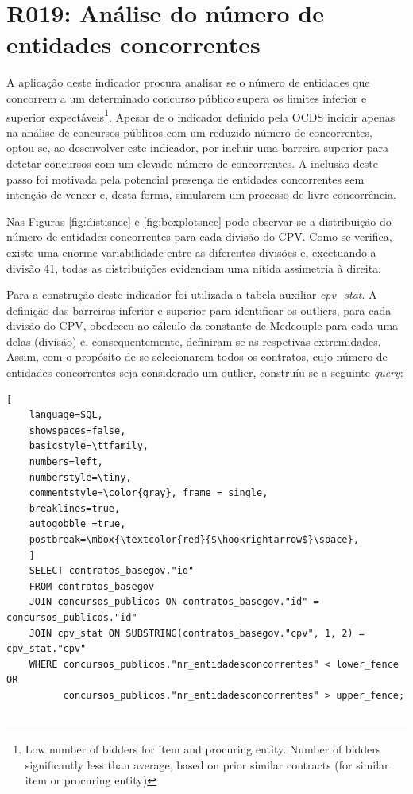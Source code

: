 \section{R019: Análise do número de entidades concorrentes}

A aplicação deste indicador procura analisar se o número de entidades que concorrem a um determinado concurso público supera os limites inferior e superior expectáveis\footnote{Low number of bidders for item and procuring entity. Number of bidders significantly less than average, based on prior similar contracts (for similar item or procuring entity)}. Apesar de o indicador definido pela OCDS incidir apenas na análise de concursos públicos com um reduzido número de concorrentes, optou-se, ao desenvolver este indicador, por incluir uma barreira superior para detetar concursos com um elevado número de concorrentes. A inclusão deste passo foi motivada pela potencial presença de entidades concorrentes sem intenção de vencer e, desta forma, simularem um processo de livre concorrência.


Nas Figuras \ref{fig:distisnec} e \ref{fig:boxplotsnec} pode observar-se a distribuição do número de entidades concorrentes para cada divisão do CPV. Como se verifica, existe uma enorme variabilidade entre as diferentes divisões e, excetuando a divisão 41, todas as distribuições evidenciam uma nítida assimetria à direita.


Para a construção deste indicador foi utilizada a tabela auxiliar \textit{cpv\_stat}. A definição das barreiras inferior e superior para identificar os outliers, para cada divisão do CPV, obedeceu ao cálculo da constante de Medcouple para cada uma delas (divisão) e, consequentemente, definiram-se as respetivas extremidades. Assim, com o propósito de se selecionarem todos os contratos, cujo número de entidades concorrentes seja considerado um outlier, construíu-se a seguinte \textit{query}: 

\begin{lstlisting}[
	language=SQL,
	showspaces=false,
	basicstyle=\ttfamily,
	numbers=left,
	numberstyle=\tiny,
	commentstyle=\color{gray}, frame = single,
	breaklines=true,
	autogobble =true,
	postbreak=\mbox{\textcolor{red}{$\hookrightarrow$}\space},
	]
	SELECT contratos_basegov."id"
	FROM contratos_basegov 
	JOIN concursos_publicos ON contratos_basegov."id" = concursos_publicos."id"
	JOIN cpv_stat ON SUBSTRING(contratos_basegov."cpv", 1, 2) = cpv_stat."cpv"
	WHERE concursos_publicos."nr_entidadesconcorrentes" < lower_fence OR
		  concursos_publicos."nr_entidadesconcorrentes" > upper_fence;
	
\end{lstlisting}

